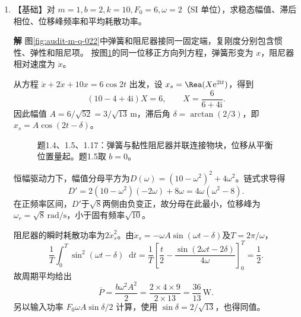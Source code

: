 \documentclass[11pt,openany,fontset=fandol]{ctexbook}
\theoremstyle{plain}\newtheorem{theorem}{定理}[chapter]\newtheorem{proposition}[theorem]{命题}
\theoremstyle{definition}\newtheorem{definition}{定义}[chapter]\newtheorem{example}{例}[chapter]
\theoremstyle{remark}\newtheorem*{remark}{说明}
\newcommand{\SolutionStart}{\par\nobreak\medskip\nobreak\noindent\textbf{解}\quad\ignorespaces}
\newenvironment{solution}{\SolutionStart}{\par\medskip}
\newcommand{\dd}{\mathop{}\!\mathrm d}\newcommand{\ii}{\mathrm i}\newcommand{\ee}{\mathrm e}
\begin{document}
\begin{enumerate}[label=1.\arabic*]
\begin{solution}
对一般复相量，令 $u=X\ee^{\ii\omega t}$，用 $\Rea u=(u+\bar u)/2$ 展开：
\[
(\Rea u)^2=\frac{u^2+2u\bar u+\bar u^2}{4}
=\frac{|X|^2}{2}+\frac12\Rea(X^2\ee^{2\ii\omega t}).
\]
中间的 $u\bar u$ 项正是直流部分的来源。平方是非线性运算，不能按单个同频相量的线性规则处理。

曲线的平均高度为 $1/2$，对应展开中的常量项；二倍频项描述它相对这条中线的起伏。
\end{solution}

\item \begin{minipage}[t]{\linewidth}
【基础】对 $m=1,b=2,k=10,F_0=6,\omega=2$（SI 单位），求稳态幅值、滞后相位、位移峰频率和平均耗散功率。

\end{minipage}

\begin{solution}
图\ref{fig:audit-m-q-022}中弹簧和阻尼器接同一固定端，复刚度分别包含惯性、弹性和阻尼项。
按图\ref{fig:ex-1-4}的同一位移正方向列方程，弹簧形变为 $x$，阻尼器相对速度为 $\dot x$。

从方程 $\ddot x+2\dot x+10x=6\cos2t$ 出发，设 $x_s=\Rea(X\ee^{2\ii t})$，得到
\[
(10-4+4\ii)X=6,\qquad X=\frac6{6+4\ii}.
\]
因此幅值 $A=6/\sqrt{52}=3/\sqrt{13}\,\mathrm m$，滞后角 $\delta=\arctan(2/3)$，即 $x_s=A\cos(2t-\delta)$。

\begin{figure}[H]\centering
{}
\caption{题1.4、1.5、1.17：弹簧与黏性阻尼器并联连接物块，位移从平衡位置量起。题1.5取 $b=0$。}\label{fig:ex-1-4}
\end{figure}

恒幅驱动力下，幅值分母平方为$D(\omega)=(10-\omega^2)^2+4\omega^2$。链式求导得
\[D'=2(10-\omega^2)(-2\omega)+8\omega
=4\omega(\omega^2-8).\]
在正频率区间，$D'$于$\sqrt8$两侧由负变正，故分母在此最小，位移峰为$\omega_r=\sqrt8\,\mathrm{rad/s}$，小于固有频率$\sqrt{10}$。

阻尼器的瞬时耗散功率为$2\dot x_s^2$。由$\dot x_s=-\omega A\sin(\omega t-\delta)$及$T=2\pi/\omega$，
\[\frac1T\int_0^T\sin^2(\omega t-\delta)\dd t
=\frac1T\left[\frac t2-\frac{\sin(2\omega t-2\delta)}{4\omega}\right]_0^T
=\frac12.\]
故周期平均给出
\[
\overline P=\frac{b\omega^2A^2}{2}
=\frac{2\times4\times9}{2\times13}=\frac{36}{13}\,\mathrm W.
\]
另以输入功率 $F_0\omega A\sin\delta/2$ 计算，使用 $\sin\delta=2/\sqrt{13}$，也得同值。


\end{solution}
\end{enumerate}
\end{document}

